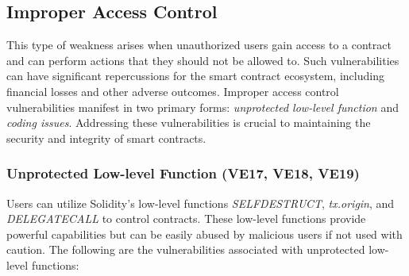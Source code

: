 \documentclass[manuscript,screen]{acmart}
\begin{document}
\subsection{Improper Access Control}
This type of weakness arises when unauthorized users gain access to a contract and can perform actions that they should not be allowed to. Such vulnerabilities can have significant repercussions for the smart contract ecosystem, including financial losses and other adverse outcomes. Improper access control vulnerabilities manifest in two primary forms: \textit{unprotected low-level function} and \textit{coding issues}. Addressing these vulnerabilities is crucial to maintaining the security and integrity of smart contracts.

\subsubsection{Unprotected Low-level Function (VE17, VE18, VE19)}
Users can utilize Solidity's low-level functions \textit{SELFDESTRUCT}, \textit{tx.origin}, and \textit{DELEGATECALL} to control contracts. These low-level functions provide powerful capabilities but can be easily abused by malicious users if not used with caution. The following are the vulnerabilities associated with unprotected low-level functions:
\end{document}
